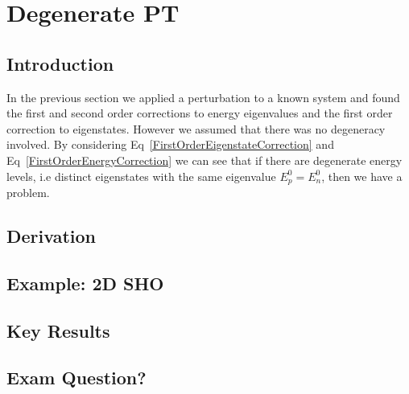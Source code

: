 \chapter{Degenerate PT}
\label{chapt2} 

\section{Introduction}

In the previous section we applied a perturbation to a known system and found the first and second order corrections to energy eigenvalues and the first order correction to eigenstates. However we assumed that there was no degeneracy involved. By considering Eq~\ref{FirstOrderEigenstateCorrection} and Eq~\ref{FirstOrderEnergyCorrection} we can see that if there are degenerate energy levels, i.e distinct eigenstates with the same eigenvalue $E^0_p = E^0_n$, then we have a problem.

\section{Derivation}

\section{Example: 2D SHO}

\section{Key Results}

\section{Exam Question?}


